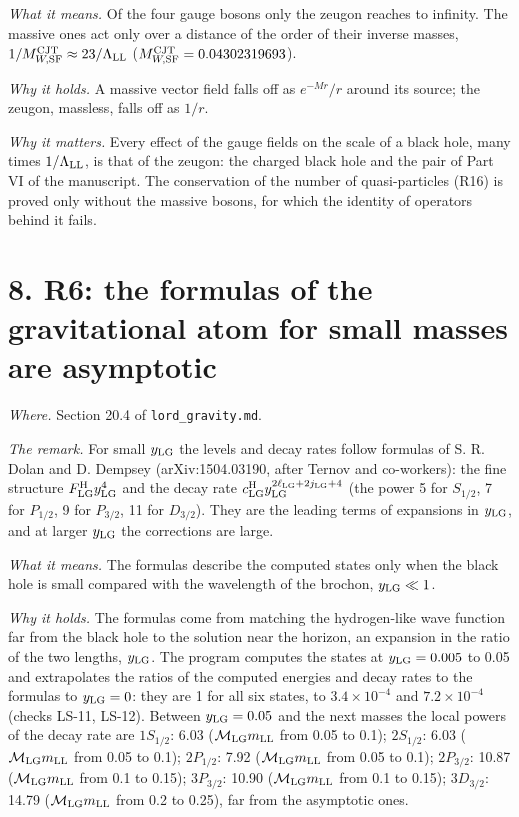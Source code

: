 \documentclass[
  10pt,
]{article}
\begin{document}
\emph{What it means.} Of the four gauge bosons only the zeugon reaches
to infinity. The massive ones act only over a distance of the order of
their inverse masses,
\(1/M^{\rm CJT}_{W,{\rm SF}}\approx23/\Lambda_{\rm LL}\)
(\(M^{\rm CJT}_{W,{\rm SF}}=0.04302319693\)).

\emph{Why it holds.} A massive vector field falls off as \(e^{-Mr}/r\)
around its source; the zeugon, massless, falls off as \(1/r\).

\emph{Why it matters.} Every effect of the gauge fields on the scale of
a black hole, many times \(1/\Lambda_{\rm LL}\), is that of the zeugon:
the charged black hole and the pair of Part VI of the manuscript. The
conservation of the number of quasi-particles (R16) is proved only
without the massive bosons, for which the identity of operators behind
it fails.

\hypertarget{r6-the-formulas-of-the-gravitational-atom-for-small-masses-are-asymptotic}{%
\section{8. R6: the formulas of the gravitational atom for small masses
are
asymptotic}\label{r6-the-formulas-of-the-gravitational-atom-for-small-masses-are-asymptotic}}

\emph{Where.} Section 20.4 of \texttt{lord\_gravity.md}.

\emph{The remark.} For small \(y_{\rm LG}\) the levels and decay rates
follow formulas of S. R. Dolan and D. Dempsey (arXiv:1504.03190, after
Ternov and co-workers): the fine structure
\(F^{\rm H}_{\rm LG}y_{\rm LG}^4\) and the decay rate
\(c^{\rm H}_{\rm LG}y_{\rm LG}^{2\ell_{\rm LG}+2j_{\rm LG}+4}\) (the
power 5 for \(S_{1/2}\), 7 for \(P_{1/2}\), 9 for \(P_{3/2}\), 11 for
\(D_{3/2}\)). They are the leading terms of expansions in
\(y_{\rm LG}\), and at larger \(y_{\rm LG}\) the corrections are large.

\emph{What it means.} The formulas describe the computed states only
when the black hole is small compared with the wavelength of the
brochon, \(y_{\rm LG}\ll1\).

\emph{Why it holds.} The formulas come from matching the hydrogen-like
wave function far from the black hole to the solution near the horizon,
an expansion in the ratio of the two lengths, \(y_{\rm LG}\). The
program computes the states at \(y_{\rm LG}=0.005\) to 0.05 and
extrapolates the ratios of the computed energies and decay rates to the
formulas to \(y_{\rm LG}=0\): they are 1 for all six states, to
\(3.4\times10^{-4}\) and \(7.2\times10^{-4}\) (checks LS-11, LS-12).
Between \(y_{\rm LG}=0.05\) and the next masses the local powers of the
decay rate are \(1S_{1/2}\): 6.03 (\(\mathcal M_{\rm LG}m_{\rm LL}\)
from 0.05 to 0.1); \(2S_{1/2}\): 6.03 (\(\mathcal M_{\rm LG}m_{\rm LL}\)
from 0.05 to 0.1); \(2P_{1/2}\): 7.92 (\(\mathcal M_{\rm LG}m_{\rm LL}\)
from 0.05 to 0.1); \(2P_{3/2}\): 10.87
(\(\mathcal M_{\rm LG}m_{\rm LL}\) from 0.1 to 0.15); \(3P_{3/2}\):
10.90 (\(\mathcal M_{\rm LG}m_{\rm LL}\) from 0.1 to 0.15);
\(3D_{3/2}\): 14.79 (\(\mathcal M_{\rm LG}m_{\rm LL}\) from 0.2 to
0.25), far from the asymptotic ones.
\end{document}
